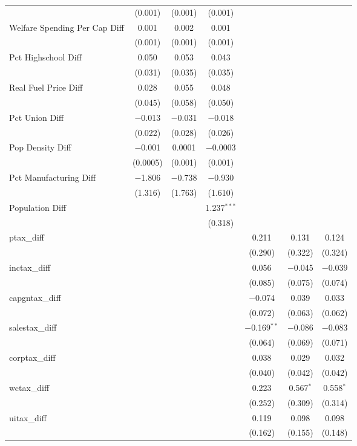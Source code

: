 \begin{table}[!htbp]
\begin{tabular}{@{\extracolsep{5pt}}lcccccc}
  & (0.001) & (0.001) & (0.001) &  &  &  \\ 
  Welfare Spending Per Cap Diff & 0.001 & 0.002 & 0.001 &  &  &  \\ 
  & (0.001) & (0.001) & (0.001) &  &  &  \\ 
  Pct Highschool Diff & 0.050 & 0.053 & 0.043 &  &  &  \\ 
  & (0.031) & (0.035) & (0.035) &  &  &  \\ 
  Real Fuel Price Diff & 0.028 & 0.055 & 0.048 &  &  &  \\ 
  & (0.045) & (0.058) & (0.050) &  &  &  \\ 
  Pct Union Diff & $-$0.013 & $-$0.031 & $-$0.018 &  &  &  \\ 
  & (0.022) & (0.028) & (0.026) &  &  &  \\ 
  Pop Density Diff & $-$0.001 & 0.0001 & $-$0.0003 &  &  &  \\ 
  & (0.0005) & (0.001) & (0.001) &  &  &  \\ 
  Pct Manufacturing Diff & $-$1.806 & $-$0.738 & $-$0.930 &  &  &  \\ 
  & (1.316) & (1.763) & (1.610) &  &  &  \\ 
  Population Diff &  &  & 1.237$^{***}$ &  &  &  \\ 
  &  &  & (0.318) &  &  &  \\ 
  ptax\_diff &  &  &  & 0.211 & 0.131 & 0.124 \\ 
  &  &  &  & (0.290) & (0.322) & (0.324) \\ 
  inctax\_diff &  &  &  & 0.056 & $-$0.045 & $-$0.039 \\ 
  &  &  &  & (0.085) & (0.075) & (0.074) \\ 
  capgntax\_diff &  &  &  & $-$0.074 & 0.039 & 0.033 \\ 
  &  &  &  & (0.072) & (0.063) & (0.062) \\ 
  salestax\_diff &  &  &  & $-$0.169$^{**}$ & $-$0.086 & $-$0.083 \\ 
  &  &  &  & (0.064) & (0.069) & (0.071) \\ 
  corptax\_diff &  &  &  & 0.038 & 0.029 & 0.032 \\ 
  &  &  &  & (0.040) & (0.042) & (0.042) \\ 
  wctax\_diff &  &  &  & 0.223 & 0.567$^{*}$ & 0.558$^{*}$ \\ 
  &  &  &  & (0.252) & (0.309) & (0.314) \\ 
  uitax\_diff &  &  &  & 0.119 & 0.098 & 0.098 \\ 
  &  &  &  & (0.162) & (0.155) & (0.148) \\ 

\end{tabular}
\end{table}
